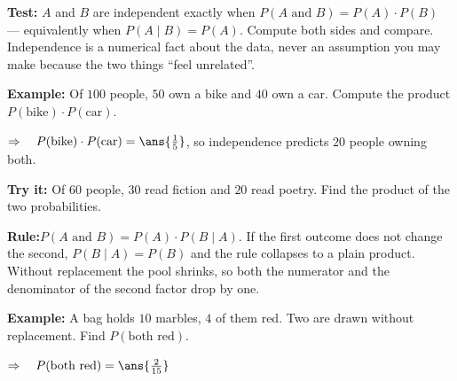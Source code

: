 \documentclass[12pt]{article}
\begin{document}

\begin{formulabox}
\textbf{Test:} $A$ and $B$ are independent exactly when
$P(A \text{ and } B) = P(A) \cdot P(B)$ --- equivalently when $P(A \mid B) = P(A)$.
Compute both sides and compare. Independence is a numerical fact about the data, never an
assumption you may make because the two things ``feel unrelated''.
\end{formulabox}

\begin{examplebox}
\textbf{Example:} \quad Of $100$ people, $50$ own a bike and $40$ own a car. Compute the product $P(\text{bike}) \cdot P(\text{car})$.

$\Rightarrow\quad P(\text{bike}) \cdot P(\text{car}) = \ans{\tfrac{1}{5}}$, so independence predicts $20$ people owning both.
\end{examplebox}

\begin{tryitbox}
\textbf{Try it:} \quad Of $60$ people, $30$ read fiction and $20$ read poetry. Find the product of the two probabilities.\\[2pt]
\end{tryitbox}


\begin{formulabox}
\textbf{Rule:}\quad $P(A \text{ and } B) = P(A) \cdot P(B \mid A)$. If the first outcome does not
change the second, $P(B \mid A) = P(B)$ and the rule collapses to a plain product. Without
replacement the pool shrinks, so both the numerator and the denominator of the second factor
drop by one.
\end{formulabox}

\begin{examplebox}
\textbf{Example:} \quad A bag holds $10$ marbles, $4$ of them red. Two are drawn without replacement. Find $P(\text{both red})$.

$\Rightarrow\quad P(\text{both red}) = \ans{\tfrac{2}{15}}$
\end{examplebox}
\end{document}
